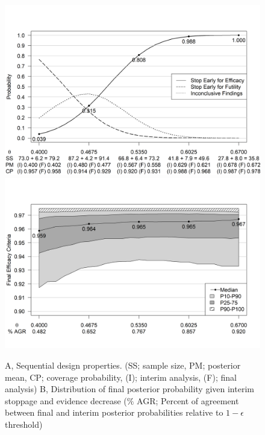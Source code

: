 \documentclass[useAMS,usenatbib,referee]{biom}
\begin{document}
\begin{figure}\begin{center}

    \includegraphics[width=6in]{figure3a.png}
    \includegraphics[width=6in]{figure3b.png}
    \caption{A, Sequential design properties. (SS; sample size, PM; posterior mean, CP; coverage probability, (I); interim analysis, (F); final analysis) B, Distribution of final posterior probability given interim stoppage and evidence decrease ($\%$ AGR; Percent of agreement between final and interim posterior probabilities relative to $1-\epsilon$ threshold)}
	\label{fig:ex1.1}

\end{center}
\end{figure}
\end{document}
